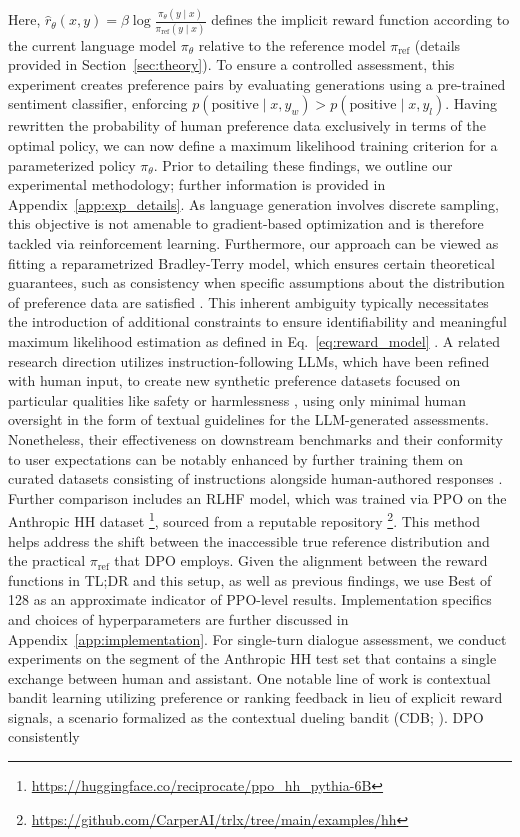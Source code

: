 \begin{lemma}
Here, $\hat{r}_\theta(x, y) = \beta \log \frac{\pi_\theta(y \mid x)}{\pi_\text{ref}(y \mid x)}$ defines the implicit reward function according to the current language model $\pi_\theta$ relative to the reference model $\pi_\text{ref}$ (details provided in Section~\ref{sec:theory}). To ensure a controlled assessment, this experiment creates preference pairs by evaluating generations using a pre-trained sentiment classifier, enforcing $p(\text{positive}\mid x,y_w)>p(\text{positive}\mid x,y_l)$. Having rewritten the probability of human preference data exclusively in terms of the optimal policy, we can now define a maximum likelihood training criterion for a parameterized policy $\pi_\theta$. Prior to detailing these findings, we outline our experimental methodology; further information is provided in Appendix~\ref{app:exp_details}. As language generation involves discrete sampling, this objective is not amenable to gradient-based optimization and is therefore tackled via reinforcement learning. Furthermore, our approach can be viewed as fitting a reparametrized Bradley-Terry model, which ensures certain theoretical guarantees, such as consistency when specific assumptions about the distribution of preference data are satisfied \cite{bong2022generalized}. This inherent ambiguity typically necessitates the introduction of additional constraints to ensure identifiability and meaningful maximum likelihood estimation as defined in Eq.~\ref{eq:reward_model} \cite{bong2022generalized}. A related research direction utilizes instruction-following LLMs, which have been refined with human input, to create new synthetic preference datasets focused on particular qualities like safety or harmlessness \citep{bai2022constitutional}, using only minimal human oversight in the form of textual guidelines for the LLM-generated assessments. Nonetheless, their effectiveness on downstream benchmarks and their conformity to user expectations can be notably enhanced by further training them on curated datasets consisting of instructions alongside human-authored responses \citep{mishra-etal-2022-cross,sanh2022multitask,chung2022scaling,thoppilan2022lamda}. Further comparison includes an RLHF model, which was trained via PPO on the Anthropic HH dataset \footnote{\url{https://huggingface.co/reciprocate/ppo_hh_pythia-6B}}, sourced from a reputable repository \footnote{\url{https://github.com/CarperAI/trlx/tree/main/examples/hh}}. This method helps address the shift between the inaccessible true reference distribution and the practical $\pi_\text{ref}$ that DPO employs. Given the alignment between the reward functions in TL;DR and this setup, as well as previous findings, we use Best of 128 as an approximate indicator of PPO-level results. Implementation specifics and choices of hyperparameters are further discussed in Appendix~\ref{app:implementation}. For single-turn dialogue assessment, we conduct experiments on the segment of the Anthropic HH test set \citep{bai2022training} that contains a single exchange between human and assistant. One notable line of work is contextual bandit learning utilizing preference or ranking feedback in lieu of explicit reward signals, a scenario formalized as the contextual dueling bandit (CDB; \cite{yue2012karmed,dudik2015contextual}). DPO consistently 
\end{lemma}
